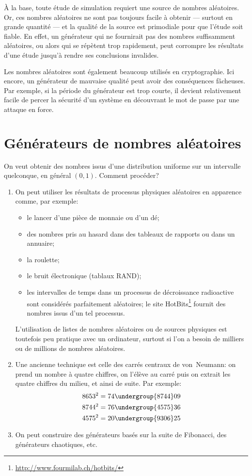 À la base, toute étude de simulation requiert une source de nombres
aléatoires. Or, ces nombres aléatoires ne sont pas toujours facile à
obtenir --- surtout en grande quantité --- et la qualité de la source
est primodiale pour que l'étude soit fiable. En effet, un générateur
qui ne fournirait pas des nombres suffisamment aléatoires, ou alors
qui se répètent trop rapidement, peut corrompre les résultats d'une
étude jusqu'à rendre ses conclusions invalides.

Les nombres aléatoires sont également beaucoup utilisés en
cryptographie. Ici encore, un générateur de mauvaise qualité peut
avoir des conséquences fâcheuses. Par exemple, si la période du
générateur est trop courte, il devient relativement facile de percer
la sécurité d'un système en découvrant le mot de passe par une attaque
en force.


\section{Générateurs de nombres aléatoires}
\label{sec:generation:generateurs}

On veut obtenir des nombres issus d'une distribution uniforme sur un
intervalle quelconque, en général $(0, 1)$. Comment procéder?
\begin{enumerate}
\item On peut utiliser les résultats de processus physiques aléatoires
  en apparence comme, par exemple:
  \begin{itemize}
  \item le lancer d'une pièce de monnaie ou d'un dé;
  \item des nombres pris au hasard dans des tableaux de rapports ou
    dans un annuaire;
  \item la roulette;
  \item le bruit électronique (tablaux RAND);
  \item les intervalles de temps dans un processus de décroissance
    radioactive sont considérés parfaitement aléatoires; le site
    HotBits\footnote{%
      \url{http://www.fourmilab.ch/hotbits/}} %
    fournit des nombres issus d'un tel processus.
  \end{itemize}
  L'utilisation de listes de nombres aléatoires ou de sources
  physiques est toutefois peu pratique avec un ordinateur, surtout si
  l'on a besoin de milliers ou de millions de nombres aléatoires.
\item Une ancienne technique est celle des carrés centraux de
  von~Neumann: on prend un nombre à quatre chiffres, on l'élève au
  carré puis on extrait les quatre chiffres du milieu, et ainsi de
  suite. Par exemple:
  \begin{align*}
    8653^2 &= 74\undergroup{8744}09 \\
    8744^2 &= 76\undergroup{4575}36 \\
    4575^2 &= 20\undergroup{9306}25
  \end{align*}
\item On peut construire des générateurs basés sur la suite de
  Fibonacci, des générateurs chaotiques, etc.
\end{enumerate}

